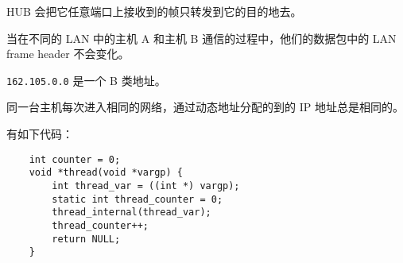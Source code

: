 \begin{problems}
        \begin{choices}
            \item HUB 会把它任意端口上接收到的帧只转发到它的目的地去。
            \item 当在不同的 LAN 中的主机 A 和主机 B 通信的过程中，他们的数据包中的 LAN frame header 不会变化。
            \item \verb|162.105.0.0| 是一个 B 类地址。
            \item 同一台主机每次进入相同的网络，通过动态地址分配的到的 IP 地址总是相同的。
        \end{choices}
         有如下代码：
        \begin{verbatim}
    int counter = 0;
    void *thread(void *vargp) {
        int thread_var = ((int *) vargp);
        static int thread_counter = 0;
        thread_internal(thread_var);
        thread_counter++;
        return NULL;
    }


\end{verbatim}
\end{problems}
